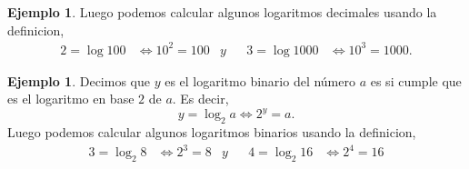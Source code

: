 \documentclass[12pt]{examdesign}
\theoremstyle{plain}
\theoremstyle{definition}
\newtheorem{exa}[theorem]{Ejemplo}
\theoremstyle{remark}
\begin{document}
\begin{endmatter}
\begin{tcolorbox}[opteqC]
\begin{exa}
    			Luego podemos calcular algunos logaritmos decimales usando la definicion,
    			\begin{align*}
    			    2=\log 100 &\Longleftrightarrow 10^{2} = 100&y&&3=\log 1000 &\Longleftrightarrow 10^{3} = 1000.
    			\end{align*} 
    		\end{exa}
        \end{tcolorbox}
        \vspace{.2cm}
        \begin{tcolorbox}[opteqC]
        	\begin{exa}
        		Decimos que $y$ es el logaritmo binario del número $a$ es si cumple que es el logaritmo en base $2$ de $a$. Es decir,
        		\begin{equation}
        		    y=\log_{2}a \Longleftrightarrow 2^{y} = a.
        		\end{equation}
        		Luego podemos calcular algunos logaritmos binarios usando la definicion,
        		\begin{align*}
        		    3=\log_{2}8 &\Longleftrightarrow 2^{3} = 8&y&&4=\log_{2}16 &\Longleftrightarrow 2^{4} = 16
        		\end{align*}
        	\end{exa}
        \end{tcolorbox}
 
    \end{endmatter}
\end{document}

